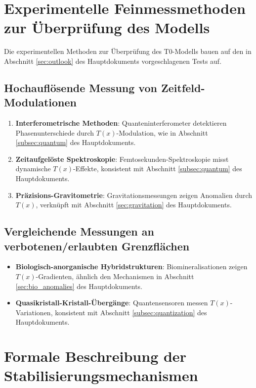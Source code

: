 \documentclass[12pt,a4paper]{article}
\newcommand{\Tfield}{T(x)}
\begin{document}
	\section{Experimentelle Feinmessmethoden zur Überprüfung des Modells}
	\label{sec:feinmessmethoden}
	
	Die experimentellen Methoden zur Überprüfung des T0-Modells bauen auf den in Abschnitt \ref{sec:outlook} des Hauptdokuments vorgeschlagenen Tests auf.
	
	\subsection{Hochauflösende Messung von Zeitfeld-Modulationen}
	\label{subsec:zeitfeld_modulationen}
	
	\begin{enumerate}
		\item \textbf{Interferometrische Methoden}: Quanteninterferometer detektieren Phasenunterschiede durch \(\Tfield\)-Modulation, wie in Abschnitt \ref{subsec:quantum} des Hauptdokuments.
		\item \textbf{Zeitaufgelöste Spektroskopie}: Femtosekunden-Spektroskopie misst dynamische \(\Tfield\)-Effekte, konsistent mit Abschnitt \ref{subsec:quantum} des Hauptdokuments.
		\item \textbf{Präzisions-Gravitometrie}: Gravitationsmessungen zeigen Anomalien durch \(\Tfield\), verknüpft mit Abschnitt \ref{sec:gravitation} des Hauptdokuments.
	\end{enumerate}
	
	\subsection{Vergleichende Messungen an verbotenen/erlaubten Grenzflächen}
	\label{subsec:grenzflaechen_messungen}
	
	\begin{itemize}
		\item \textbf{Biologisch-anorganische Hybridstrukturen}: Biomineralisationen zeigen \(\Tfield\)-Gradienten, ähnlich den Mechanismen in Abschnitt \ref{sec:bio_anomalies} des Hauptdokuments.
		\item \textbf{Quasikristall-Kristall-Übergänge}: Quantensensoren messen \(\Tfield\)-Variationen, konsistent mit Abschnitt \ref{subsec:quantization} des Hauptdokuments.
	\end{itemize}
	
	\section{Formale Beschreibung der Stabilisierungsmechanismen}
	\label{sec:formale_beschreibung}
	
\end{document}
